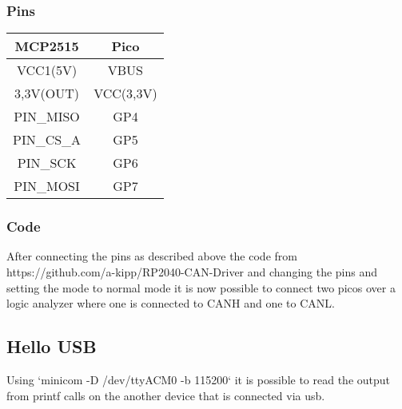 \subsubsection{Pins}

\begin{tabular}{||c c||} 
  \hline
  MCP2515 & Pico \\ [0.5ex] 
  \hline
  
  \hline
  VCC1(5V) & VBUS \\ 
  \hline
  3,3V(OUT) & VCC(3,3V) \\
  \hline
  PIN\_MISO & GP4 \\
  \hline
  PIN\_CS\_A & GP5 \\
  \hline
  PIN\_SCK & GP6 \\
  \hline
  PIN\_MOSI & GP7 \\
  \hline
\end{tabular}

\subsubsection{Code}
After connecting the pins as described above the code from https://github.com/a-kipp/RP2040-CAN-Driver and changing the pins and setting the mode to normal mode it is now possible to connect two picos over a logic analyzer where one is connected to CANH and one to CANL.


\subsection{Hello USB}
Using `minicom -D /dev/ttyACM0 -b 115200` it is possible to read the output from printf calls on the another device that is connected via usb.
